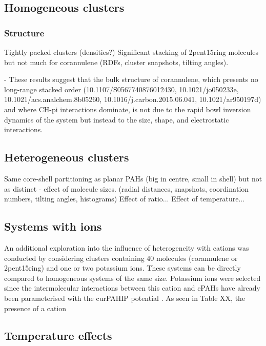 \subsection{Homogeneous clusters}
\subsubsection{Structure}
Tightly packed clusters (densities?)
Significant stacking of 2pent15ring molecules but not much for corannulene (RDFs, cluster snapshots, tilting angles).


- These results suggest that the bulk structure of corannulene, which presents no long-range stacked order (10.1107/S0567740876012430, 10.1021/jo050233e, 10.1021/acs.analchem.8b05260, 10.1016/j.carbon.2015.06.041, 10.1021/ar950197d) and where CH-pi interactions dominate, is not due to the rapid bowl inversion dynamics of the system but instead to the size, shape, and electrostatic interactions.




\subsection{Heterogeneous clusters}
Same core-shell partitioning as planar PAHs (big in centre, small in shell) but not as distinct - effect of molecule sizes. (radial distances, snapshots, coordination numbers, tilting angles, histograms)
Effect of ratio...
Effect of temperature...


\subsection{Systems with ions}
An additional exploration into the influence of heterogeneity with cations was conducted by considering clusters containing 40 molecules (corannulene or 2pent15ring) and one or two potassium ions.  These systems can be directly compared to homogeneous systems of the same size.  Potassium ions were selected since the intermolecular interactions between this cation and cPAHs have already been parameterised with the curPAHIP potential \cite{bowal2019ion}. As seen in Table XX, the presence of a cation


\subsection{Temperature effects}


